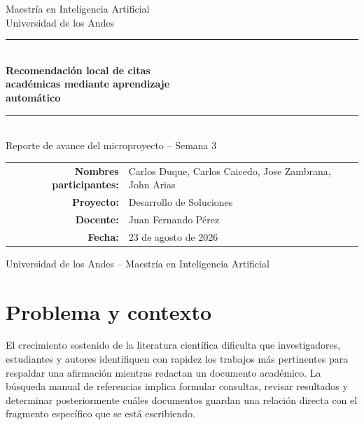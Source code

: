 \documentclass[11pt]{article}
\begin{document}
\begin{titlepage}
\centering
\vspace*{2.5cm}

{\Large \color{midgray} Maestría en Inteligencia Artificial}\\[0.2cm]
{\large \color{midgray} Universidad de los Andes}\\[2.5cm]

{\color{primaryblue}\rule{\linewidth}{1.2pt}}\\[0.6cm]
{\Huge \bfseries \color{primaryblue} Recomendación local de citas\\ académicas mediante aprendizaje\\ automático}\\[0.6cm]
{\color{primaryblue}\rule{\linewidth}{1.2pt}}\\[0.8cm]

{\Large Reporte de avance del microproyecto -- Semana 3}\\[3cm]

\begin{tabular}{rl}
\textbf{Nombres participantes:} & Carlos Duque, Carlos Caicedo, Jose Zambrana, John Arias \\[4pt]
\textbf{Proyecto:} & Desarrollo de Soluciones \\[4pt]
\textbf{Docente:} & Juan Fernando Pérez \\[4pt]
\textbf{Fecha:} & 23 de agosto de 2026 \\
\end{tabular}

\vfill
{\small \color{midgray} Universidad de los Andes -- Maestría en Inteligencia Artificial}
\end{titlepage}

\tableofcontents
\newpage

\section{Problema y contexto}

El crecimiento sostenido de la literatura científica dificulta que investigadores, estudiantes y autores identifiquen con rapidez los trabajos más pertinentes para respaldar una afirmación mientras redactan un documento académico. La búsqueda manual de referencias implica formular consultas, revisar resultados y determinar posteriormente cuáles documentos guardan una relación directa con el fragmento específico que se está escribiendo.
\end{document}
